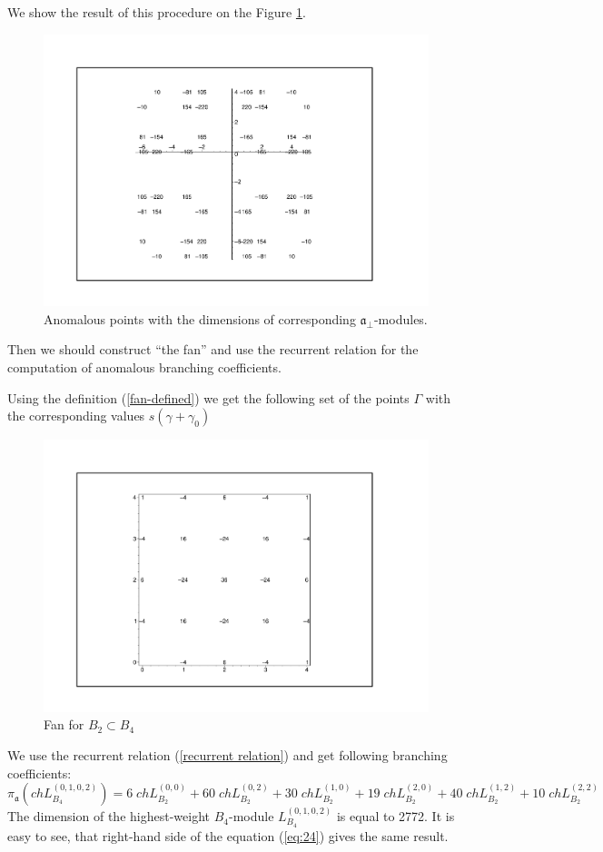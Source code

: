 \documentclass[a4paper,12pt]{article}
\theoremstyle{definition} \newtheorem{Def}{Definition}
\begin{document}
We show the result of this procedure on the Figure \ref{fig:B4B2anom}.
\begin{figure}[h]
    \includegraphics[width=170mm]{B4_B2_anom_points.pdf}
  \caption{Anomalous points with the dimensions of corresponding $\mathfrak{a}_{\bot}$-modules.}
  \label{fig:B4B2anom}
\end{figure}

Then we should construct ``the fan'' and use the recurrent relation for the computation of anomalous branching coefficients.

Using the definition (\ref{fan-defined}) we get the following set of
the points $\Gamma$ with the corresponding values $s(\gamma+\gamma_0)$
\begin{figure}[h]
  \includegraphics[width=150mm]{B4_B2_fan.pdf}
  \caption{Fan for $B_2\subset B_4$}
  \label{fig:B4B2Fan}
\end{figure}
We use the recurrent relation (\ref{recurrent relation}) and get
following branching coefficients:
\begin{equation}
  \label{eq:24}
  \pi_{\mathfrak{a}} \left(ch L^{(0,1,0,2)}_{B_4}\right) = 6 \; ch L^{(0,0)}_{B_2}+ 60
  \; ch L_{B_2}^{(0,2)}+ 30 \; ch L_{B_2}^{(1,0)}+ 19 \; ch L_{B_2}^{(2,0)}+
  40 \; ch L_{B_2}^{(1,2)}+ 10 \; ch L_{B_2}^{(2,2)}
\end{equation}
The dimension of the highest-weight $B_4$-module $L^{(0,1,0,2)}_{B_4}$
is equal to 2772. It is easy to see, that right-hand side of the
equation (\ref{eq:24}) gives the same result.
\end{document}
